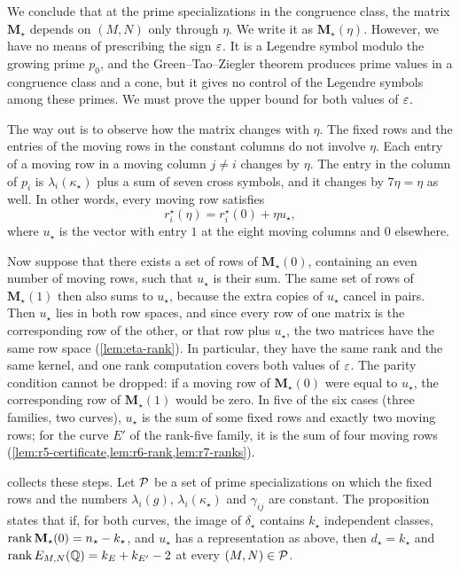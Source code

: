 We conclude that at the prime specializations in the congruence class, the matrix $\mathbf M_\star$ depends on $(M,N)$ only through $\eta$. We write it as $\mathbf M_\star(\eta)$. However, we have no means of prescribing the sign $\varepsilon$. It is a Legendre symbol modulo the growing prime $p_0$, and the Green--Tao--Ziegler theorem produces prime values in a congruence class and a cone, but it gives no control of the Legendre symbols among these primes. We must prove the upper bound for both values of $\varepsilon$.

The way out is to observe how the matrix changes with $\eta$. The fixed rows and the entries of the moving rows in the constant columns do not involve $\eta$. Each entry of a moving row in a moving column $j\ne i$ changes by $\eta$. The entry in the column of $p_i$ is $\lambda_i(\kappa_\star)$ plus a sum of seven cross symbols, and it changes by $7\eta=\eta$ as well. In other words, every moving row satisfies
\begin{equation*}
r^\star_i(\eta)=r^\star_i(0)+\eta u_\star,
\end{equation*}
where $u_\star$ is the vector with entry $1$ at the eight moving columns and $0$ elsewhere.

Now suppose that there exists a set of rows of $\mathbf M_\star(0)$, containing an even number of moving rows, such that $u_\star$ is their sum. The same set of rows of $\mathbf M_\star(1)$ then also sums to $u_\star$, because the extra copies of $u_\star$ cancel in pairs. Then $u_\star$ lies in both row spaces, and since every row of one matrix is the corresponding row of the other, or that row plus $u_\star$, the two matrices have the same row space (\cref{lem:eta-rank}). In particular, they have the same rank and the same kernel, and one rank computation covers both values of $\varepsilon$. The parity condition cannot be dropped: if a moving row of $\mathbf M_\star(0)$ were equal to $u_\star$, the corresponding row of $\mathbf M_\star(1)$ would be zero. In five of the six cases (three families, two curves), $u_\star$ is the sum of some fixed rows and exactly two moving rows; for the curve $E'$ of the rank-five family, it is the sum of four moving rows (\cref{lem:r5-certificate,lem:r6-rank,lem:r7-ranks}).

 collects these steps. Let $\mathcal P$ be a set of prime specializations on which the fixed rows and the numbers $\lambda_i(g)$, $\lambda_i(\kappa_\star)$ and $\gamma_{ij}$ are constant. The proposition states that if, for both curves, the image of $\delta_\star$ contains $k_\star$ independent classes, $\operatorname{rank}\mathbf M_\star(0)=n_\star-k_\star$, and $u_\star$ has a representation as above, then $d_\star=k_\star$ and $\operatorname{rank} E_{M,N}(\mathbb Q)=k_E+k_{E'}-2$ at every $(M,N)\in\mathcal P$.

